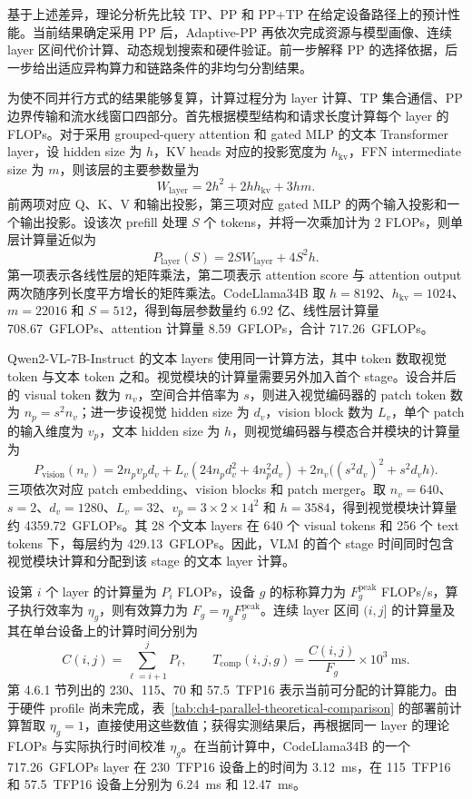 基于上述差异，理论分析先比较 TP、PP 和 PP+TP 在给定设备路径上的预计性能。当前结果确定采用 PP 后，Adaptive-PP 再依次完成资源与模型画像、连续 layer 区间代价计算、动态规划搜索和硬件验证。前一步解释 PP 的选择依据，后一步给出适应异构算力和链路条件的非均匀分割结果。

为使不同并行方式的结果能够复算，计算过程分为 layer 计算、TP 集合通信、PP 边界传输和流水线窗口四部分。首先根据模型结构和请求长度计算每个 layer 的 FLOPs。对于采用 grouped-query attention 和 gated MLP 的文本 Transformer layer，设 hidden size 为 \(h\)，KV heads 对应的投影宽度为 \(h_{\mathrm{kv}}\)，FFN intermediate size 为 \(m\)，则该层的主要参数量为
\[
W_{\mathrm{layer}}=2h^2+2hh_{\mathrm{kv}}+3hm.
\]
前两项对应 Q、K、V 和输出投影，第三项对应 gated MLP 的两个输入投影和一个输出投影。设该次 prefill 处理 \(S\) 个 tokens，并将一次乘加计为 2 FLOPs，则单层计算量近似为
\[
P_{\mathrm{layer}}(S)=
2SW_{\mathrm{layer}}+4S^2h.
\]
第一项表示各线性层的矩阵乘法，第二项表示 attention score 与 attention output 两次随序列长度平方增长的矩阵乘法。CodeLlama34B 取 \(h=8192\)、\(h_{\mathrm{kv}}=1024\)、\(m=22016\) 和 \(S=512\)，得到每层参数量约 6.92 亿、线性层计算量 708.67~GFLOPs、attention 计算量 8.59~GFLOPs，合计 717.26~GFLOPs。

Qwen2-VL-7B-Instruct 的文本 layers 使用同一计算方法，其中 token 数取视觉 token 与文本 token 之和。视觉模块的计算量需要另外加入首个 stage。设合并后的 visual token 数为 \(n_v\)，空间合并倍率为 \(s\)，则进入视觉编码器的 patch token 数为 \(n_p=s^2n_v\)；进一步设视觉 hidden size 为 \(d_v\)，vision block 数为 \(L_v\)，单个 patch 的输入维度为 \(v_p\)，文本 hidden size 为 \(h\)，则视觉编码器与模态合并模块的计算量为
\[
P_{\mathrm{vision}}(n_v)=
2n_pv_pd_v
+L_v(24n_pd_v^2+4n_p^2d_v)
+2n_v\bigl((s^2d_v)^2+s^2d_vh\bigr).
\]
三项依次对应 patch embedding、vision blocks 和 patch merger。取 \(n_v=640\)、\(s=2\)、\(d_v=1280\)、\(L_v=32\)、\(v_p=3\times2\times14^2\) 和 \(h=3584\)，得到视觉模块计算量约 4359.72~GFLOPs。其 28 个文本 layers 在 640 个 visual tokens 和 256 个 text tokens 下，每层约为 429.13~GFLOPs。因此，VLM 的首个 stage 时间同时包含视觉模块计算和分配到该 stage 的文本 layer 计算。

设第 \(i\) 个 layer 的计算量为 \(P_i\) FLOPs，设备 \(g\) 的标称算力为 \(F_g^{\mathrm{peak}}\) FLOPs/s，算子执行效率为 \(\eta_g\)，则有效算力为 \(F_g=\eta_gF_g^{\mathrm{peak}}\)。连续 layer 区间 \((i,j]\) 的计算量及其在单台设备上的计算时间分别为
\[
C(i,j)=\sum_{\ell=i+1}^{j}P_{\ell},
\qquad
T_{\mathrm{comp}}(i,j,g)=\frac{C(i,j)}{F_g}\times10^3\ \mathrm{ms}.
\]
第 4.6.1 节列出的 230、115、70 和 57.5~TFP16 表示当前可分配的计算能力。由于硬件 profile 尚未完成，表~\ref{tab:ch4-parallel-theoretical-comparison} 的部署前计算暂取 \(\eta_g=1\)，直接使用这些数值；获得实测结果后，再根据同一 layer 的理论 FLOPs 与实际执行时间校准 \(\eta_g\)。在当前计算中，CodeLlama34B 的一个 717.26~GFLOPs layer 在 230~TFP16 设备上的时间为 3.12~ms，在 115~TFP16 和 57.5~TFP16 设备上分别为 6.24~ms 和 12.47~ms。

